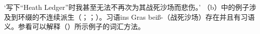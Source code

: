 \begin{exe}
\begin{xlist}[iv.]
\begin{exe}
\begin{xlist}[iv.]
{}
\glt `写下“Heath Ledger”时我甚至无法不再次为其战死沙场而悲伤。'
\zl
（b）中的例子涉及到环缀\gee 的不连续派生（\citealp[\S~3.4.3]{Luedeling2001a}；\citealp[--327, 372--377]{Mueller2002b}；\citealp[\S~2.2.1, \S~5.2.1]{Mueller2003a}）。习语ins Gras beiß-（战死沙场）存在并且有习语义。参看可以解释（）所示例子的词汇方法。






\end{xlist}
\end{exe}
\end{xlist}
\end{exe}
